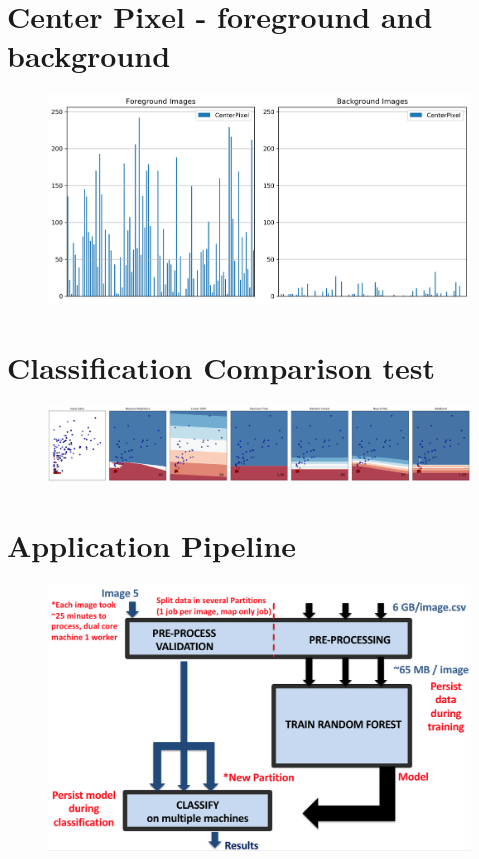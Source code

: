 \documentclass{neu_handout}
\begin{document}
\section{Center Pixel - foreground and background}
\begin{figure}[!h]
  \includegraphics[width=0.6\linewidth]{feature-compare-CenterPixel}
  \label{fig:feature-compare-CenterPixel}
\end{figure}

\newpage

\section{Classification Comparison test}
\begin{figure}[!h]
  \includegraphics[width=1\linewidth]{classification-test}
  \label{fig:classification-test}
\end{figure}

\section{Application Pipeline}
\begin{figure}[!h]
  \includegraphics[width=0.7\linewidth]{pipeline}
  \label{fig:pipeline}
\end{figure}
\end{document}

